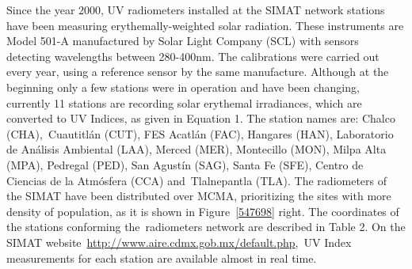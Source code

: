 \documentclass[10pt]{article}
\begin{document}
Since the year 2000, UV radiometers installed at the SIMAT network
stations have been measuring erythemally-weighted solar radiation. These
instruments are Model 501-A manufactured by Solar Light Company (SCL)
with sensors detecting wavelengths between 280-400nm. The calibrations
were carried out every year, using a reference sensor by the same
manufacture. Although at the beginning only a few stations were in
operation and have been changing, currently 11 stations are recording
solar erythemal irradiances, which are converted to UV Indices, as given
in Equation 1. The station names are: Chalco (CHA),~Cuautitlán (CUT),
FES Acatlán (FAC), Hangares (HAN), Laboratorio de Análisis Ambiental
(LAA), Merced (MER), Montecillo (MON), Milpa Alta (MPA), Pedregal (PED),
San Agustín (SAG), Santa Fe (SFE), Centro de Ciencias de la Atmósfera
(CCA) and~Tlalnepantla (TLA). The radiometers of the SIMAT have been
distributed over MCMA, prioritizing the sites with more density of
population, as it is shown in Figure~{\ref{547698}}
right. The coordinates of the stations conforming the~radiometers
network are described in Table 2. On the SIMAT
website~\url{http://www.aire.cdmx.gob.mx/default.php},~UV Index
measurements for each station are available almost in real time.~
\end{document}
